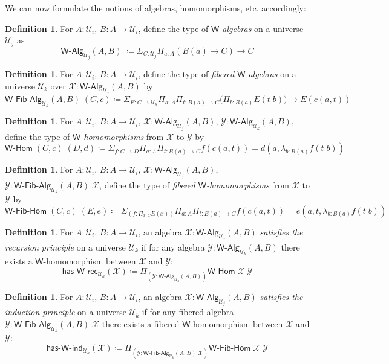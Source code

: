 \documentclass[11pt]{article}
\newcommand{\X}{\mathcal{X}}
\newcommand{\Y}{\mathcal{Y}}
\newcommand{\prd}[1]{\Pi_{#1}}
\newcommand{\sm}[1]{\Sigma_{#1}}
\newcommand{\lam}[1]{\lambda_{#1}}
\newcommand{\defeq}{\coloneqq}
\newcommand{\W}{\mathsf{W}}
\newcommand{\UU}{\mathcal{U}}
\newcommand{\WAlg}{\mathsf{W}\text{-}\mathsf{Alg}}
\newcommand{\WFibAlg}{\mathsf{W}\text{-}\mathsf{Fib}\text{-}\mathsf{Alg}}
\newcommand{\WHom}{\mathsf{W}\text{-}\mathsf{Hom}}
\newcommand{\WFibHom}{\mathsf{W}\text{-}\mathsf{Fib}\text{-}\mathsf{Hom}}
\newcommand{\HasWRec}{\mathsf{has}\text{-}\mathsf{W}\text{-}\mathsf{rec}}
\newcommand{\HasWInd}{\mathsf{has}\text{-}\mathsf{W}\text{-}\mathsf{ind}}
\theoremstyle{definition}
\newtheorem{definition}[theorem]{Definition}
\begin{document}
We can now formulate the notions of algebras, homomorphisms, etc. accordingly:

\begin{definition}\label{def:WAlg}
For $A:\UU_i$, $B : A \to \UU_i$, define the type of \emph{$\W$-algebras} on a universe $\UU_j$ as
\[\WAlg_{\UU_j}(A,B) \; \defeq \sm{C : \UU_j} \prd{a:A} (B(a) \to C) \to C \]
\end{definition}

\begin{definition}\label{def:WFibAlg}
For $A:\UU_i$, $B : A \to \UU_i$, define the type of \emph{fibered $\W$-algebras} on a universe $\UU_k$ over $\mathcal{X} : \WAlg_{\UU_j}(A,B)$ by
\[\WFibAlg_{\UU_k}(A,B) \; (C,c) \defeq \sm{E : C \to \UU_k} \prd{a:A}\prd{t: B(a) \to C} \big(\prd{b:B(a)} E(t \;b) \big) \to E(c(a,t)) \]
\end{definition}

\begin{definition}\label{def:WHom}
For $A:\UU_i$, $B : A \to \UU_i$, $\X : \WAlg_{\UU_j}(A,B)$, $\Y : \WAlg_{\UU_k}(A,B)$, define the type of \emph{$\W$-homomorphisms} from $\X$ to $\Y$ by
\[ \WHom \; (C,c) \; (D,d) \defeq \sm{f:C\to D}\prd{a:A}\prd{t: B(a) \to C} f(c(a,t)) = d(a,\lam{b:B(a)} f(t\;b)) \]
\end{definition}

\begin{definition}\label{def:WFibHom}
For $A:\UU_i$, $B : A \to \UU_i$, $\X : \WAlg_{\UU_j}(A,B)$, $\Y : \WFibAlg_{\UU_k}(A,B) \; \X$, define the type of \emph{fibered $\W$-homomorphisms} from $\X$ to $\Y$ by
\[ \WFibHom \; (C,c) \; (E,e) \defeq \sm{(f:\prd{x:C}E(x))}\prd{a:A}\prd{t: B(a) \to C} f(c(a,t)) = e(a,t,\lam{b:B(a)} f(t\;b)) \]
\end{definition}

\begin{definition}\label{def:WRec}
For $A:\UU_i$, $B : A \to \UU_i$, an algebra $\X : \WAlg_{\UU_j}(A,B)$ \emph{satisfies the recursion principle} on a universe $\UU_k$ if for any algebra $\Y : \WAlg_{\UU_k}(A,B)$ there exists
a $\W$-homomorphism between $\X$ and $\Y$:
\[ \HasWRec_{\UU_k}(\X) \defeq \prd{(\Y:\WAlg_{\UU_k}(A,B))} \WHom \; \X \; \Y \]
\end{definition}

\begin{definition}\label{def:WInd}
For $A:\UU_i$, $B : A \to \UU_i$, an algebra $\X : \WAlg_{\UU_j}(A,B)$ \emph{satisfies the induction principle} on a universe $\UU_k$ if for any fibered algebra $\Y : \WFibAlg_{\UU_k}(A,B) \; \X$ there exists a fibered $\W$-homomorphism between $\X$ and $\Y$:
\[ \HasWInd_{\UU_k}(\X) \defeq \prd{(\Y:\WFibAlg_{\UU_k}(A,B) \; \X)} \WFibHom \; \X \; \Y \]
\end{definition}
\end{document}
